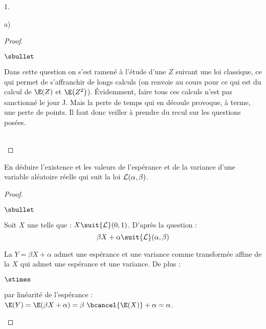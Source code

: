 \begin{noliste}{1.}
\begin{noliste}{a)}
\begin{proof}
\begin{remark}
\begin{noliste}{$\sbullet$}
        \item Dans cette question on s'est ramené à l'étude d'une \var
          $Z$ suivant une loi classique, ce qui permet de s'affranchir
          de longs calculs (on renvoie au cours pour ce qui est du
          calcul de $\E(Z)$ et $\E\big( Z^2 \big)$). Évidemment, faire
          tous ces calculs n'est pas sanctionné le jour J. Mais la
          perte de temps qui en découle provoque, à terme, une perte
          de points. Il faut donc veiller à prendre du recul sur les
          questions posées.          
        \end{noliste}
      \end{remark}~\\[-1.2cm]
    \end{proof}

  \item En déduire l'existence et les valeurs de l'espérance et de la
    variance d'une variable aléatoire réelle qui suit la loi ${\cal
      L}(\alpha,\beta)$.

    \begin{proof}~
      \begin{noliste}{$\sbullet$}
      \item Soit $X$ une \var telle que : $X \suit {\cal L}(0,
        1)$. D'après la question  :
        \[
        \beta X + \alpha \suit {\cal L}(\alpha, \beta)
        \]
        
        
        
        \newpage
        
        
        
      \item La \var $Y = \beta X + \alpha$ admet une espérance et une
        variance comme transformée affine de la \var $X$ qui admet une
        espérance et une variance. De plus : 
        \begin{noliste}{$\stimes$}
        \item par linéarité de l'espérance : $\E(Y) = \E(\beta X +
          \alpha) = \beta \ \bcancel{\E(X)} + \alpha = \alpha$.


\end{noliste}
\end{noliste}
\end{proof}
\end{noliste}
\end{noliste}
